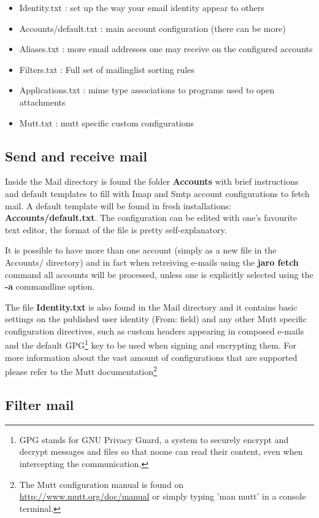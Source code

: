 \documentclass[a4,onecolumn,portrait]{article}
\begin{document}
\begin{itemize}
\item Identity.txt : set up the way your email identity appear to others
\item Accounts/default.txt : main account configuration (there can be more)
\item Aliases.txt : more email addresses one may receive on the configured accounts
\item Filters.txt : Full set of mailinglist sorting rules
\item Applications.txt : mime type associations to programs used to open attachments
\item Mutt.txt : mutt specific custom configurations
\end{itemize}

\subsection{Send and receive mail}
\label{sec-4-1}

Inside the Mail directory is found the folder \textbf{Accounts} with brief
instructions and default templates to fill with Imap and Smtp account
configurations to fetch mail. A default template will be found in
fresh installations: \textbf{Accounts/default.txt}. The configuration can
be edited with one's favourite text editor, the format of the file
is pretty self-explanatory.

It is possible to have more than one account (simply as a new file
in the Accounts/ directory) and in fact when retreiving e-mails
using the \textbf{jaro fetch} command all accounts will be processed,
unless one is explicitly selected using the \textbf{-a} commandline
option.

The file \textbf{Identity.txt} is also found in the Mail directory and it
contains basic settings on the published user identity (From:
field) and any other Mutt specific configuration directives, such
as custom headers appearing in composed e-mails and the default
GPG\footnote{GPG stands for GNU Privacy Guard, a system to securely
encrypt and decrypt messages and files so that noone can read their
content, even when intercepting the communication.} key to be used when signing and encrypting them.  For
more information about the vast amount of configurations that are
supported please refer to the Mutt documentation\footnote{The Mutt configuration manual is found on \url{http://www.mutt.org/doc/manual} or simply typing 'man mutt' in a console terminal.}
\subsection{Filter mail}
\label{sec-4-2}
\end{document}
